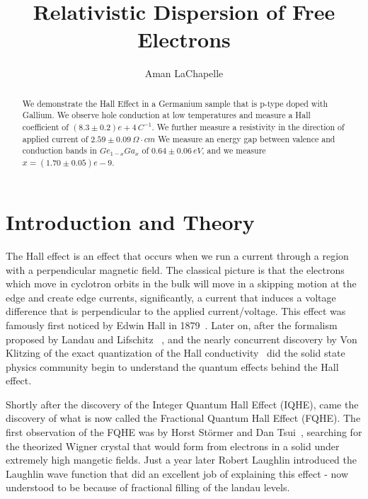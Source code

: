 \documentclass[reprint, nobibnotes, amssymb, amsmath, amsfonts, physics, mathtools, mathrsfs, floatfix]{revtex4-1}
\begin{document}
  \title{Relativistic Dispersion of Free Electrons}

  \author{Aman LaChapelle}

  \begin{abstract}
    We demonstrate the Hall Effect in a Germanium sample that is p-type doped with Gallium.  We observe hole conduction at low temperatures and measure a Hall coefficient of $(8.3 \pm 0.2)e+4\,C^{-1}$.  We further measure a resistivity in the direction of applied current of $2.59\pm0.09\,\Omega \cdot cm$  We measure an energy gap between valence and conduction bands in $Ge_{1-x}Ga_x$ of $0.64\pm0.06 \, eV$, and we measure $x = (1.70\pm0.05)e-9$.
  \end{abstract}

  \maketitle
  \tableofcontents

  \section{Introduction and Theory}
    The Hall effect is an effect that occurs when we run a current through a region with a perpendicular magnetic field.  The classical picture is that the electrons which move in cyclotron orbits in the bulk will move in a skipping motion at the edge and create edge currents, significantly, a current that induces a voltage difference that is perpendicular to the applied current/voltage.  This effect was famously first noticed by Edwin Hall in 1879~\cite{classical_hall}.  Later on, after the formalism proposed by Landau and Lifschitz ~\cite{landau}, and the nearly concurrent discovery by Von Klitzing of the exact quantization of the Hall conductivity~\cite{Von_Klitzing} did the solid state physics community begin to understand the quantum effects behind the Hall effect.

    Shortly after the discovery of the Integer Quantum Hall Effect (IQHE), came the discovery of what is now called the Fractional Quantum Hall Effect (FQHE).  The first observation of the FQHE was by Horst St\"{o}rmer and Dan Tsui~\cite{stormer_tsui}, searching for the theorized Wigner crystal that would form from electrons in a solid under extremely high mangetic fields.  Just a year later Robert Laughlin introduced the Laughlin wave function that did an excellent job of explaining this effect - now understood to be because of fractional filling of the landau levels.
\end{document}
